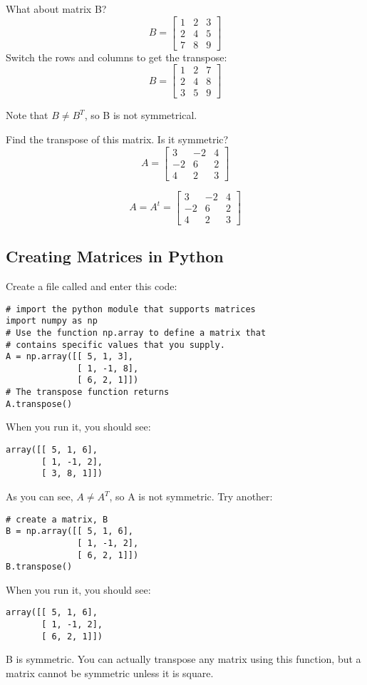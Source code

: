 What about matrix B? 
$$
B = \begin{bmatrix}
1 & 2 & 3 \\
2 & 4 & 5 \\
7 & 8 & 9
\end{bmatrix}
$$
Switch the rows and columns to get the transpose:
$$
B = \begin{bmatrix}
1 & 2 & 7 \\
2 & 4 & 8 \\
3 & 5 & 9
\end{bmatrix}
$$

Note that $B \neq B^T$, so B is not symmetrical.

\begin{Exercise}[title={Matrix Transposition}, label=matrix-transpose01]
Find the transpose of this matrix. Is it symmetric? 
$$A = \begin{bmatrix}
 		3 & -2 &4  \\
 		-2 & 6 &2 \\
 		4 & 2 & 3 
	  \end{bmatrix}$$
\end{Exercise}
\begin{Answer}[ref=matrix-transpose01]
$$A =  A^t = 
	  \begin{bmatrix}
 		3 & -2 & 4  \\
 		-2 & 6 & 2 \\
 		4 & 2 & 3 
	\end{bmatrix}$$
\end{Answer}

\subsection{Creating Matrices in Python}
Create a file called  and enter this code:
\begin{Verbatim}
# import the python module that supports matrices
import numpy as np
# Use the function np.array to define a matrix that 
# contains specific values that you supply.
A = np.array([[ 5, 1, 3], 
              [ 1, -1, 8], 
              [ 6, 2, 1]])
# The transpose function returns 
A.transpose()
\end{Verbatim}
When you run it, you should see:
\begin{Verbatim}
array([[ 5, 1, 6], 
       [ 1, -1, 2], 
       [ 3, 8, 1]])
\end{Verbatim}
As you can see, $A\neq A^T$, so A is not symmetric.
Try another: 
\begin{Verbatim}
# create a matrix, B
B = np.array([[ 5, 1, 6], 
              [ 1, -1, 2], 
              [ 6, 2, 1]])
B.transpose()
\end{Verbatim}
When you run it, you should see:
\begin{Verbatim}
array([[ 5, 1, 6], 
       [ 1, -1, 2], 
       [ 6, 2, 1]])
\end{Verbatim}
B is symmetric. You can actually transpose any matrix using this function, but a matrix cannot be symmetric unless it is square. 

